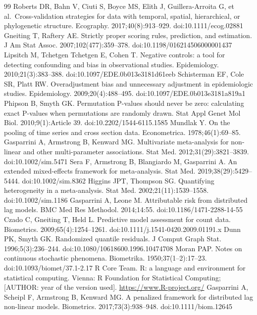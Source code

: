 \documentclass[11pt,a4paper]{article}
\begin{document}
\begin{thebibliography}{99}
 Roberts DR, Bahn V, Ciuti S, Boyce MS, Elith J, Guillera-Arroita G, et al.~Cross-validation strategies for data with temporal, spatial, hierarchical, or phylogenetic structure. Ecography. 2017;40(8):913--929. doi:10.1111/ecog.02881
 Gneiting T, Raftery AE. Strictly proper scoring rules, prediction, and estimation. J Am Stat Assoc. 2007;102(477):359--378. doi:10.1198/016214506000001437
 Lipsitch M, Tchetgen Tchetgen E, Cohen T. Negative controls: a tool for detecting confounding and bias in observational studies. Epidemiology. 2010;21(3):383--388. doi:10.1097/EDE.0b013e3181d61eeb
 Schisterman EF, Cole SR, Platt RW. Overadjustment bias and unnecessary adjustment in epidemiologic studies. Epidemiology. 2009;20(4):488--495. doi:10.1097/EDE.0b013e3181a819a1
 Phipson B, Smyth GK. Permutation P-values should never be zero: calculating exact P-values when permutations are randomly drawn. Stat Appl Genet Mol Biol. 2010;9(1):Article 39. doi:10.2202/1544-6115.1585
 Mundlak Y. On the pooling of time series and cross section data. Econometrica. 1978;46(1):69--85.
 Gasparrini A, Armstrong B, Kenward MG. Multivariate meta-analysis for non-linear and other multi-parameter associations. Stat Med. 2012;31(29):3821--3839. doi:10.1002/sim.5471
 Sera F, Armstrong B, Blangiardo M, Gasparrini A. An extended mixed-effects framework for meta-analysis. Stat Med. 2019;38(29):5429--5444. doi:10.1002/sim.8362
 Higgins JPT, Thompson SG. Quantifying heterogeneity in a meta-analysis. Stat Med. 2002;21(11):1539--1558. doi:10.1002/sim.1186
 Gasparrini A, Leone M. Attributable risk from distributed lag models. BMC Med Res Methodol. 2014;14:55. doi:10.1186/1471-2288-14-55
 Czado C, Gneiting T, Held L. Predictive model assessment for count data. Biometrics. 2009;65(4):1254--1261. doi:10.1111/j.1541-0420.2009.01191.x
 Dunn PK, Smyth GK. Randomized quantile residuals. J Comput Graph Stat. 1996;5(3):236--244. doi:10.1080/10618600.1996.10474708
 Moran PAP. Notes on continuous stochastic phenomena. Biometrika. 1950;37(1--2):17--23. doi:10.1093/biomet/37.1-2.17
 R Core Team. R: a language and environment for statistical computing. Vienna: R Foundation for Statistical Computing; {[}AUTHOR: year of the version used{]}. \url{https://www.R-project.org/}
 Gasparrini A, Scheipl F, Armstrong B, Kenward MG. A penalized framework for distributed lag non-linear models. Biometrics. 2017;73(3):938--948. doi:10.1111/biom.12645

\end{thebibliography}
\end{document}
